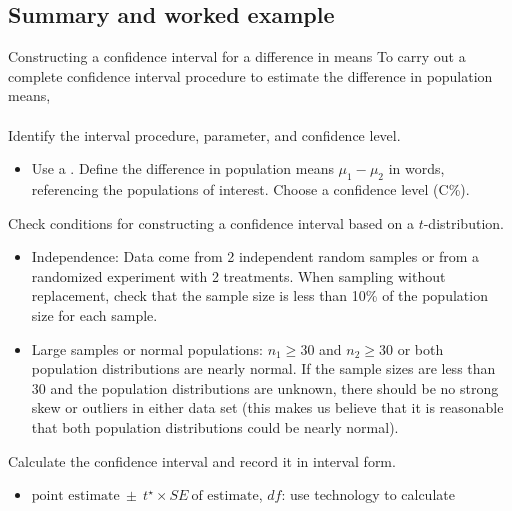 \subsection[Summary and worked example]{Summary and worked example}
\begin{onebox}{Constructing a confidence interval for a difference in means}
To carry out a complete confidence interval procedure to estimate the difference in population means,
\\
\\
 Identify the interval procedure, parameter, and confidence level.\vspace{-1mm}
\begin{itemize}
\item[] Use a . Define the difference in population means $\mu_1 - \mu_2$ in words, referencing the populations of interest.  Choose a confidence level (C\%).  
\end{itemize}
  Check conditions for constructing a confidence interval based on a $t$-distribution.  
{\setlength{\leftmargini}{13mm}
\begin{itemize}
\setlength{\itemsep}{0mm}
\item[1.] Independence:  Data come from 2 independent random samples or from a randomized 
experiment with 2 treatments.  When sampling without replacement, check that the  
sample size is less than 10\% of the population size for each sample.
\item[2.] Large samples or normal populations:  $n_1\ge 30$ and $n_2\ge 30$ or both population 
distributions are nearly normal.  If the sample sizes are less than 30 and the population distributions are unknown, there should be no strong skew or outliers in either data set (this makes us believe that it is reasonable that both population distributions could be nearly normal).  
\end{itemize}
}
   Calculate the confidence interval and record it in interval form.
\begin{itemize}
\item[] $\text{point estimate}\ \pm \ t^{\star} \times SE\ \text{of estimate}$, \quad $df$: use technology to calculate

\end{itemize}
\end{onebox}
